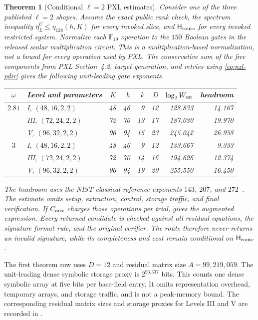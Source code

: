 \documentclass[11pt]{article}
\newtheorem{theorem}{Theorem}[section]
\newcommand{\F}{\mathbb F}
\begin{document}
\begin{theorem}[Conditional $\ell=2$ PXL estimates]
\label{thm:pxl-l2-estimates}
Consider one of the three published $\ell=2$ shapes.  Assume the exact public
rank check, the spectrum inequality $\bar\eta_L^U\le\eta_{128}(h,K)$ for
every invoked slice, and $\mathsf H_{\rm route}$ for every invoked restricted
system.  Normalize each $\F_{19}$ operation to the $150$ Boolean gates in the
released scalar multiplication circuit.  This is a multiplication-based
normalization, not a bound for every operation used by PXL.
The conservative sum of the five components from PXL Section~4.2, target
generation, and retries using \eqref{eq:pxl-pdir} gives the following
unit-leading gate exponents.

\begin{center}
\small
\setlength{\tabcolsep}{4pt}
\begin{tabular}{@{}c l r r r r r r@{}}
\toprule
$\omega$ & Level and parameters & $K$ & $h$ & $k$ & $D$ & $\log_2 W_{\rm est}$ & headroom\\
\midrule
$2.81$ & I, $(48,16,2,2)$ & 48 & 46 & 9  & 12 & 128.833 & 14.167\\
       & III, $(72,24,2,2)$ & 72 & 70 & 13 & 17 & 187.030 & 19.970\\
       & V, $(96,32,2,2)$ & 96 & 94 & 15 & 23 & 245.042 & 26.958\\
\midrule
$3$    & I, $(48,16,2,2)$ & 48 & 46 & 9  & 12 & 133.667 & 9.333\\
       & III, $(72,24,2,2)$ & 72 & 70 & 14 & 16 & 194.626 & 12.374\\
       & V, $(96,32,2,2)$ & 96 & 94 & 19 & 20 & 255.550 & 16.450\\
\bottomrule
\end{tabular}
\end{center}

The headroom uses the NIST classical reference exponents $143$, $207$, and
$272$~\cite{NISTSecurityCriteria2026}.  The estimate omits setup, extraction,
control, storage traffic, and final verification.  If $C_{\rm aux}$ charges
those operations per trial,  gives the augmented
expression.  Every returned candidate is checked against all residual
equations, the signature format rule, and the original verifier.  The route
therefore never returns an invalid signature, while its completeness and cost
remain conditional on $\mathsf H_{\rm route}$.
\end{theorem}

The first theorem row uses $D=12$ and residual matrix size
$A=99{,}219{,}059$.  The unit-leading dense symbolic storage proxy is
$2^{93.337}$ bits.  This counts one dense symbolic array at five bits per
base-field entry.  It omits representation overhead, temporary arrays, and
storage traffic, and is not a peak-memory bound.  The corresponding residual
matrix sizes and storage proxies for Levels III and V are recorded in
.
\end{document}
